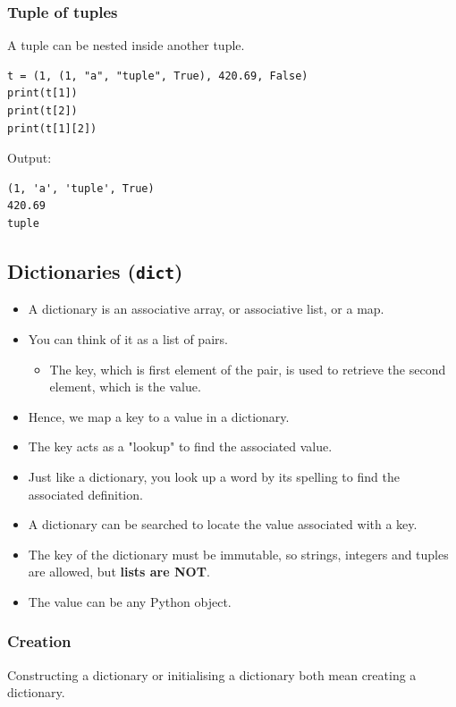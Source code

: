\documentclass[11pt]{article}
\begin{document}
\subsubsection{Tuple of tuples}
\label{sec:org1c74d25}
A tuple can be nested inside another tuple.
\begin{verbatim}
t = (1, (1, "a", "tuple", True), 420.69, False)
print(t[1])
print(t[2])
print(t[1][2])
\end{verbatim}

 \noindent Output:

\begin{verbatim}
(1, 'a', 'tuple', True)
420.69
tuple
\end{verbatim}


 \newpage

\subsection{Dictionaries (\texttt{dict})}
\label{sec:orgc2f6dae}
\begin{itemize}
\item A dictionary is an associative array, or associative list, or a map.
\item You can think of it as a list of pairs.
\begin{itemize}
\item The key, which is first element of the pair, is used to retrieve the second element, which is the value.
\end{itemize}
\item Hence, we map a key to a value in a dictionary.
\item The key acts as a "lookup" to find the associated value.
\item Just like a dictionary, you look up a word by its spelling to find the associated definition.
\item A dictionary can be searched to locate the value associated with a key.
\item The key of the dictionary must be immutable, so strings, integers and tuples are allowed, but \textbf{lists are NOT}.
\item The value can be any Python object.
\end{itemize}

\subsubsection{Creation}
\label{sec:orgb5f6c3a}
Constructing a dictionary or initialising a dictionary both mean creating a dictionary.
\end{document}
